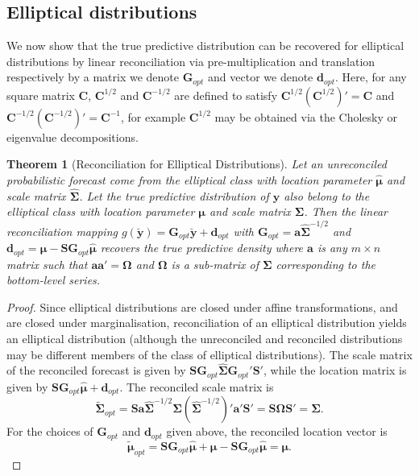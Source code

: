 \documentclass[12pt]{article}
\newtheorem{theo}{Theorem}[section]
\theoremstyle{definition}
\begin{document}
\subsection{Elliptical distributions}

We now show that the true predictive distribution can be recovered for elliptical distributions by linear reconciliation via pre-multiplication and translation respectively by a matrix we denote ${\bm G}_{opt}$ and vector we denote ${\bm d}_{opt}$. Here, for any square matrix $\bm{C}$, $\bm{C}^{1/2}$ and $\bm{C}^{-1/2}$ are defined to satisfy $\bm{C}^{1/2}(\bm{C}^{1/2})'=\bm{C}$ and $\bm{C}^{-1/2}(\bm{C}^{-1/2})'=\bm{C}^{-1}$, for example $\bm{C}^{1/2}$ may be obtained via the Cholesky or eigenvalue decompositions.

\begin{theo}[Reconciliation for Elliptical Distributions]
	Let an unreconciled probabilistic forecast come from the elliptical class with location parameter $\hat{\bm{\mu}}$ and scale matrix $\hat{\bm{\Sigma}}$. Let the true predictive distribution of $\bm{y}$ also belong to the elliptical class with location parameter $\bm{\mu}$ and scale matrix $\bm{\Sigma}$. Then the linear reconciliation mapping $g(\breve{\bm{y}})=\bm{G}_{opt}\breve{\bm{y}}+\bm{d}_{opt}$ with $\bm{G}_{opt}={\bm{a}}\hat{\bm\Sigma}^{-1/2}$ and $\bm{d}_{opt}=\bm{\mu}-\bm{S}\bm{G}_{opt}\hat{\bm{\mu}}$ recovers the true predictive density where ${\bm{a}}$ is any $m\times n$ matrix such that ${\bm{a}}{\bm{a}}'=\bm{\Omega}$ and $\bm{\Omega}$ is a sub-matrix of $\bm{\Sigma}$ corresponding to the bottom-level series.
\end{theo}

\begin{proof}
	Since elliptical distributions are closed under affine transformations, and are closed under marginalisation, reconciliation of an elliptical distribution yields an elliptical distribution (although the unreconciled and reconciled distributions may be different members of the class of elliptical distributions). The scale matrix of the reconciled forecast is given by $\bm{S}\bm{G}_{opt}\hat{\bm{\Sigma}}\bm{G}_{opt}'\bm{S}'$, while the location matrix is given by $\bm{S}\bm{G}_{opt}\hat{\bm{\mu}}+\bm{d}_{opt}$. The reconciled scale matrix is
	\[
	\tilde{\bm{\Sigma}}_{opt}
	= \bm{S}{\bm{a}}\hat{\bm\Sigma}^{-1/2}\hat{\bm{\Sigma}}\left(\hat{\bm\Sigma}^{-1/2}\right)'{\bm{a}}'\bm{S}'
	= \bm{S}\bm{\Omega}\bm{S}'
	= \bm{\Sigma}.
	\]
	For the choices of $\bm{G}_{opt}$ and $\bm{d}_{opt}$ given above, the reconciled location vector is
	\[
	\tilde{\bm{\mu}}_{opt}= \bm{S}\bm{G}_{opt}\hat{\bm{\mu}}+\bm{\mu}-\bm{S}\bm{G}_{opt}\hat{\bm{\mu}}
	= \bm{\mu}.
	\]
\end{proof}
\end{document}
